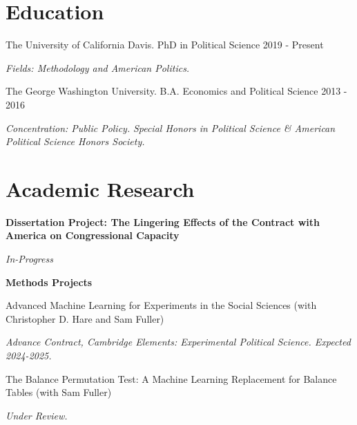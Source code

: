 \documentclass[
  11pt,
]
{article}
\providecommand{\tightlist}{%
  \setlength{\itemsep}{0pt}\setlength{\parskip}{0pt}}
\renewenvironment{itemize}{
  \begin{list}{}{
    \setlength{\leftmargin}{1.5em}
  }
}{
  \end{list}
}
\begin{document}
\hypertarget{education}{%
\section{Education}\label{education}}

The University of California Davis. PhD in Political Science \hfill 2019
- Present

\begin{itemize}
\tightlist
\item
  \emph{Fields: Methodology and American Politics.}
\end{itemize}

The George Washington University. B.A. Economics and Political Science
\hfill 2013 - 2016

\begin{itemize}
\tightlist
\item
  \emph{Concentration: Public Policy.} \emph{Special Honors in Political
  Science \& American Political Science Honors Society.}
\end{itemize}

\hypertarget{academic-research}{%
\section{Academic Research}\label{academic-research}}

\textbf{Dissertation Project: The Lingering Effects of the Contract with
America on Congressional Capacity}

\begin{itemize}
\tightlist
\item
  \emph{In-Progress}
\end{itemize}

\textbf{Methods Projects}

Advanced Machine Learning for Experiments in the Social Sciences (with
Christopher D. Hare and Sam Fuller)

\begin{itemize}
\tightlist
\item
  \emph{Advance Contract, Cambridge Elements: Experimental Political
  Science. Expected 2024-2025.}
\end{itemize}

The Balance Permutation Test: A Machine Learning Replacement for Balance
Tables (with Sam Fuller)

\begin{itemize}
\tightlist
\item
  \emph{Under Review.}
\end{itemize}
\end{document}
